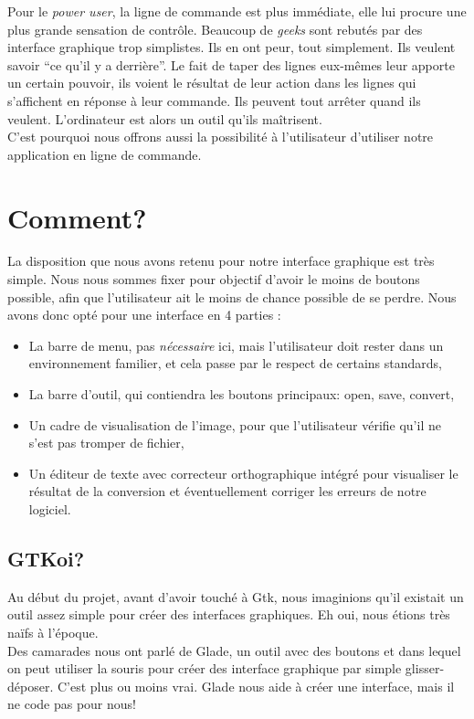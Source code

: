 \documentclass[a4paper,12pt]{report}
\begin{document}
Pour le \emph{power user}, la ligne de commande est plus immédiate, elle lui procure une plus grande sensation de contrôle. Beaucoup de \emph{geeks} sont rebutés par des interface graphique trop simplistes. Ils en ont peur, tout simplement. Ils veulent savoir ``ce qu’il y a derrière''. Le fait de taper des lignes eux-mêmes leur apporte un certain pouvoir, ils voient le résultat de leur action dans les lignes qui s’affichent en réponse à leur commande. Ils peuvent tout arrêter quand ils veulent. L’ordinateur est alors un outil qu’ils maîtrisent. \\
C’est pourquoi nous offrons aussi la possibilité à l’utilisateur d’utiliser notre application en ligne de commande.


\pagebreak

\section{Comment?} %
\label{sec:comment_}
La disposition que nous avons retenu pour notre interface graphique est très simple. Nous nous sommes fixer pour objectif d’avoir le moins de boutons possible, afin que l’utilisateur ait le moins de chance possible de se perdre. 
Nous avons donc opté pour une interface en 4 parties :\\

\begin{itemize}
	\item La barre de menu, pas \emph{nécessaire} ici, mais l’utilisateur doit rester dans un environnement familier, et cela passe par le respect de certains standards,
	\item La barre d’outil, qui contiendra les boutons principaux: open, save, convert,
	\item Un cadre de visualisation de l’image, pour que l’utilisateur vérifie qu’il ne s’est pas tromper de fichier,
	\item Un éditeur de texte avec correcteur orthographique intégré pour visualiser le résultat de la conversion et éventuellement corriger les erreurs de notre logiciel.
\end{itemize}



\subsection{GTKoi?} %
\label{sec:gtkoi_}
Au début du projet, avant d’avoir touché à Gtk, nous imaginions qu’il existait un outil assez simple pour créer des interfaces graphiques. Eh oui, nous étions très naïfs à l’époque. \\
Des camarades nous ont parlé de Glade, un outil avec des boutons et dans lequel on peut utiliser la souris pour créer des interface graphique par simple glisser-déposer. C'est plus ou moins vrai. Glade nous aide à créer une interface, mais il ne code pas pour nous! 
\end{document}
